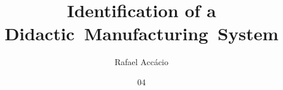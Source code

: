 \documentclass[masc,grad]{coppe} %
\title{Identification of a Didactic~Manufacturing~System}
\author{Rafael Accácio}{Nogueira}
\date{04}{2019}
\begin{document}

% 
\mainmatter
% 








\backmatter


\nocite{*}


\appendix

% 

\end{document}
